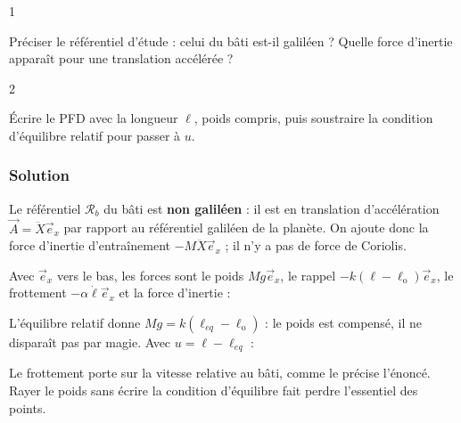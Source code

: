 \documentclass[11pt,a4paper]{article}
\newcommand{\equationajustee}[1]{%
  \sbox{\boiteequation}{$\displaystyle #1$}%
  \ifdim\wd\boiteequation>\linewidth
    \[\resizebox{\linewidth}{!}{\usebox{\boiteequation}}\]%
  \else
    \[#1\]%
  \fi}
\begin{document}
\begin{indication}{1}

Préciser le référentiel d'étude : celui du bâti est-il galiléen ? Quelle force d'inertie apparaît pour une translation accélérée ?

\end{indication}

\begin{indication}{2}

Écrire le PFD avec la longueur \(\ell\), poids compris, puis soustraire la condition d'équilibre relatif pour passer à \(u\).

\end{indication}

\hypertarget{solution-16}{%
\subsubsection{Solution}\label{solution-16}}

Le référentiel \(\mathcal R_b\) du bâti est \textbf{non galiléen} : il est en translation d'accélération \(\vec A=\ddot X\vec e_x\) par rapport au référentiel galiléen de la planète. On ajoute donc la force d'inertie d'entraînement \(-M\ddot X\vec e_x\) ; il n'y a pas de force de Coriolis.

Avec \(\vec e_x\) vers le bas, les forces sont le poids \(Mg\vec e_x\), le rappel \(-k(\ell-\ell_{\mathrm{o}})\vec e_x\), le frottement \(-\alpha\dot\ell\vec e_x\) et la force d'inertie :

\equationajustee{M\ddot\ell=Mg-k(\ell-\ell_{\mathrm{o}})-\alpha\dot\ell-M\ddot X}

L'équilibre relatif donne \(Mg=k(\ell_{eq}-\ell_{\mathrm{o}})\) : le poids est compensé, il ne disparaît pas par magie. Avec \(u=\ell-\ell_{eq}\) :

\equationajustee{\ddot u+\frac\alpha M\dot u+\frac kMu=-\ddot X}

\equationajustee{\boxed{\begin{aligned}
\Omega_{\mathrm{o}}&=\sqrt{\frac kM}\\
Q&=\frac{\sqrt{kM}}{\alpha}
\end{aligned}}}

\begin{piege}

Le frottement porte sur la vitesse relative au bâti, comme le précise l'énoncé. Rayer le poids sans écrire la condition d'équilibre fait perdre l'essentiel des points.

\end{piege}
\end{document}
